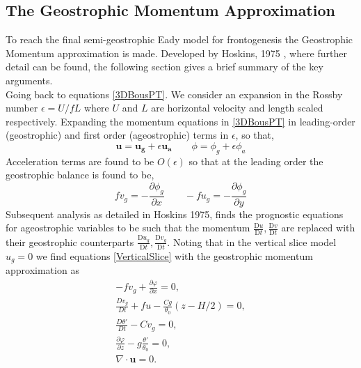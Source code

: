 \subsection{The Geostrophic Momentum Approximation \label{Geostrophic}}
To reach the final semi-geostrophic Eady model for frontogenesis the Geostrophic Momentum approximation is made. Developed by Hoskins, 1975 \cite{Hoskins1975}, where further detail can be found, the following section gives a brief summary of the key arguments.\\
\linebreak
Going back to equations \ref{3DBousPT}. We consider an expansion in the Rossby number $\epsilon = U/fL$ where $U$ and $L$ are horizontal velocity and length scaled respectively. Expanding the momentum equations in \ref{3DBousPT} in leading-order (geostrophic) and first order (ageostrophic) terms in $\epsilon$, so that,
\begin{equation*}
	\bm{u} = \bm{u_g} + \epsilon \bm{u_a} \qquad \phi = \phi_g +\epsilon \phi_a
\end{equation*}
Acceleration terms are found to be $O(\epsilon)$ so that at the leading order the geostrophic balance is found to be,
\begin{equation}
	fv_g  = -\frac{\partial \phi_g}{\partial x} \qquad
	-fu_g  = -\frac{\partial \phi_g}{\partial y}
\end{equation}
Subsequent analysis as detailed in Hoskins 1975, \cite{Hoskins1975} finds the prognostic equations for ageostrophic variables to be such that the momentum $\frac{\mathrm{D}u}{\mathrm{D}t}, \frac{\mathrm{D}v}{\mathrm{D}t}$ are replaced with their geostrophic counterparts $\frac{\mathrm{D}u_g}{\mathrm{D}t}, \frac{\mathrm{D}v_g}{\mathrm{D}t}$. Noting that in the vertical slice model $u_g = 0$ we find equations \ref{VerticalSlice} with the geostrophic momentum approximation as
\begin{equation}
	\begin{aligned}
		-fv_g + \frac{\partial \varphi}{\partial x} = 0,\\
		\frac{Dv_g}{Dt} + fu -\frac{Cg}{\theta _0}\left(z-H/2\right) = 0,\\
		\frac{D\theta'}{Dt} - Cv_g = 0,\\
		\frac{\partial \varphi}{\partial z} - g\frac{\theta'}{\theta_0} = 0,\\
		\nabla \cdot \bm{u} = 0.
	\end{aligned}
\label{EadyModel}
\end{equation}
